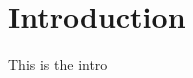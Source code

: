 \documentclass[12pt]{article}
\begin{document}



\tableofcontents
\listoffigures
\listoftables
\newpage

\setcounter{page}{1}
\section{Introduction}

This is the intro 
  








\clearpage
\printbibliography
\end{document}
